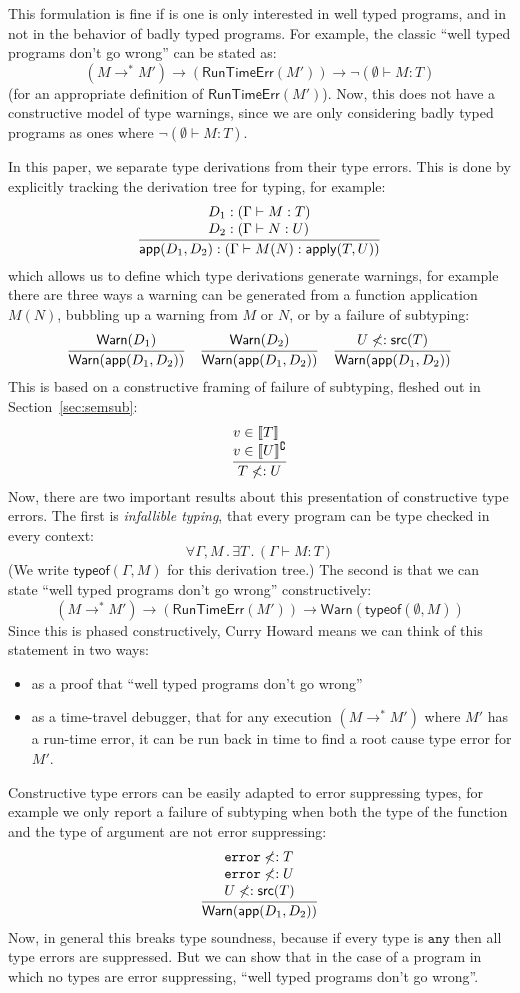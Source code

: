 \documentclass[acmsmall,review,screen]{acmart}
\makeatletter
\newcommand{\infer}[2]{\frac{\displaystyle\begin{array}{@{}l@{}}#1\end{array}}{\displaystyle#2}}
\newcommand{\ANY}{\mathtt{any}}
\newcommand{\ERROR}{\mathtt{error}}
\newcommand{\WARN}{\mathsf{Warn}}
\newcommand{\RUNTIMEERR}{\mathsf{RunTimeErr}}
\newcommand{\APPLY}{\mathsf{apply}}
\newcommand{\APP}{\mathsf{app}}
\newcommand{\SRC}{\mathsf{src}}
\newcommand{\TYPEOF}{\mathsf{typeof}}
\newcommand{\fun}{\mathbin{\rightarrow}}
\newcommand{\sem}[1]{\llbracket{#1}\rrbracket}
\newcommand{\nsem}[1]{\llbracket{#1}\rrbracket^\complement}
\newcommand{\st}{\mathbin.}
\makeatother
\begin{document}
This formulation is fine if is one is only interested in well typed programs,
and in not in the behavior of badly typed programs. For example,
the classic ``well typed programs don't go wrong'' can be stated as:
\[
  (M \rightarrow^* M') \fun
  (\RUNTIMEERR(M')) \fun
  \neg(\emptyset \vdash M : T)
\]
(for an appropriate definition of $\RUNTIMEERR(M')$). Now, this does not have
a constructive model of type warnings, since we are only considering
badly typed programs as ones where $\neg(\emptyset \vdash M : T)$.

In this paper, we separate type derivations from their type errors.
This is done by explicitly tracking the derivation tree for typing,
for example:
\[
  \infer{
    D_1 : (\Gamma \vdash M : T) \\
    D_2 : (\Gamma \vdash N : U)
  }{
    \APP(D_1, D_2) : (\Gamma \vdash M(N) : \APPLY(T,U))
  }
\]
which allows us to define which type derivations generate warnings,
for example there are three ways a warning can be generated from a
function application $M(N)$, bubbling up a warning from $M$ or $N$, or
by a failure of subtyping:
\[
  \infer{
    \WARN(D_1)
  }{
    \WARN(\APP(D_1, D_2))
  }
\quad
  \infer{
    \WARN(D_2)
  }{
    \WARN(\APP(D_1, D_2))
  }
\quad
  \infer{
    U \not<: \SRC(T)
  }{
    \WARN(\APP(D_1, D_2))
  }
\]
This is based on a constructive framing of failure of subtyping,
fleshed out in Section~\ref{sec:semsub}:
\[
\infer{
    v \in \sem{T} \\
    v \in \nsem{U} \\
  }{
    T \not<: U
  }
\]
Now, there are two important results about this presentation of
constructive type errors. The first is \emph{infallible typing},
that every program can be type checked in every context:
\[
  \forall \Gamma, M \st
  \exists T \st
  (\Gamma \vdash M : T)
\]
(We write $\TYPEOF(\Gamma, M)$ for this derivation tree.)
The second is that we can state ``well typed programs don't go wrong''
constructively:
\[
  (M \rightarrow^* M') \fun
  (\RUNTIMEERR(M')) \fun
  \WARN(\TYPEOF(\emptyset, M))
\]
Since this is phased constructively,
Curry Howard means we can think of this statement in two ways:
\begin{itemize}
  \item as a proof that ``well typed programs don't go wrong''
  \item as a time-travel debugger,
    that for any execution $(M \rightarrow^* M')$
    where $M'$ has a run-time error,
    it can be run back in time to find a root cause type error for $M'$.
\end{itemize}
Constructive type errors can be easily adapted to error suppressing
types, for example we only report a failure of subtyping when both the
type of the function and the type of argument are not error suppressing:
\[
\infer{
    \ERROR \not<: T \\
    \ERROR \not<: U \\
    U \not<: \SRC(T)
  }{
    \WARN(\APP(D_1, D_2))
  }
\]
Now, in general this breaks type soundness, because if every type is
$\ANY$ then all type errors are suppressed. But we can show that in
the case of a program in which no types are error suppressing,
``well typed programs don't go wrong''.
\end{document}
